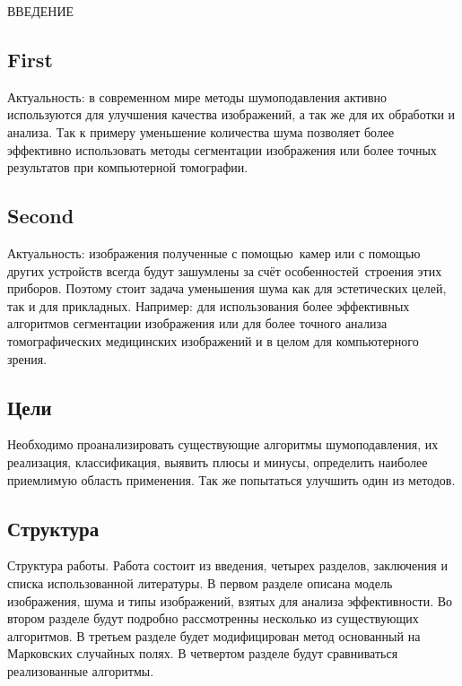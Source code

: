 ВВЕДЕНИЕ
\subsection{First}
Актуальность: в современном мире методы шумоподавления активно используются для улучшения качества изображений, а так же для их обработки и анализа. Так к примеру уменьшение количества шума позволяет более эффективно использовать методы сегментации изображения или более точных результатов при компьютерной томографии.
\subsection{Second}
Актуальность: изображения полученные с помощью камер или с помощью других устройств всегда будут зашумлены за счёт особенностей строения этих приборов. Поэтому стоит задача уменьшения шума как для эстетических целей, так и для прикладных. Например: для использования более эффективных алгоритмов сегментации изображения или для более точного анализа томографических медицинских изображений и в целом для компьютерного зрения.
\subsection{Цели}
Необходимо проанализировать существующие алгоритмы шумоподавления, их реализация, классификация, выявить плюсы и минусы, определить наиболее приемлимую область применения. Так же попытаться улучшить один из методов.
\subsection{Структура}
Структура работы. Работа состоит из введения, четырех разделов, заключения и списка использованной литературы. В первом разделе  описана модель изображения, шума и типы изображений, взятых для анализа эффективности. Во втором разделе будут подробно рассмотренны несколько из существующих алгоритмов. В третьем разделе будет модифицирован метод основанный на Марковских случайных полях. В четвертом разделе будут сравниваться реализованные алгоритмы. 